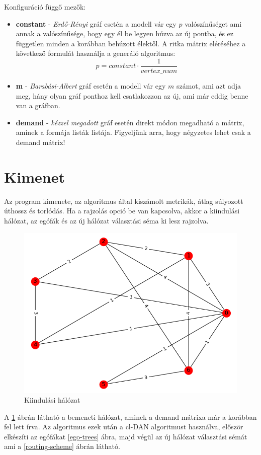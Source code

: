 \documentclass[12pt]{report}
\begin{document}
Konfiguráció függő mezők:
\begin{itemize}
	\item \textbf{constant} - \textit{Erdő-Rényi} gráf esetén a modell vár egy \(p\) valószínűséget ami annak a valószínűsége, hogy egy él be legyen húzva az új pontba, és ez független minden a korábban behúzott élektől. 
	A ritka mátrix eléréséhez a következő formulát használja a generáló algoritmus:  \[p = constant \cdot \frac{1}{vertex\_num}\]
	\item \textbf{m} - \textit{Barabási-Albert} gráf esetén a modell vár egy \(m\) számot, ami azt adja meg, hány olyan gráf ponthoz kell csatlakozzon az új, ami már eddig benne van a gráfban. 
	\item \textbf{demand} -  \textit{kézzel megadott} gráf esetén direkt módon megadható a mátrix, aminek a formája listák listája. 
	Figyeljünk arra, hogy négyzetes lehet csak a demand mátrix!
\end{itemize}

\section{Kimenet}

Az program kimenete, az algoritmus által kiszámolt metrikák, átlag súlyozott úthossz és torlódás. 
Ha a rajzolás opció be van kapcsolva, akkor a kiindulási hálózat, az egófák és az új hálózat választási séma ki lesz rajzolva.

\begin{figure}[h]
	\begin{center}
		\includegraphics[width=0.49\linewidth]{pictures/starting_network.png}
		\caption{Kiindulási hálózat}
		\label{starting-network}
	\end{center}
\end{figure}

A \ref{starting-network} ábrán látható a bemeneti hálózat, aminek a demand mátrixa már a korábban fel lett írva. Az algoritmus ezek után a cl-DAN algoritmust használva, először elkészíti az egófákat \ref{ego-trees} ábra, majd végül az új hálózat választási sémát ami a \ref{routing-scheme} ábrán látható.
\end{document}
